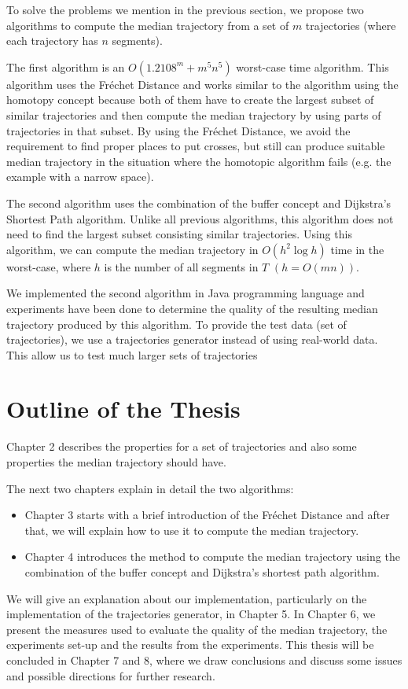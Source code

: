 To solve the problems we mention in the previous section, we propose two algorithms to compute the median trajectory from a set of $m$ trajectories (where each trajectory has $n$ segments).

The first algorithm is an $O(1.2108^{m} + m^{5}n^{5})$ worst-case time algorithm.
This algorithm uses the Fr\'{e}chet Distance \cite{AltGodau:1995} and works similar to the algorithm using the homotopy concept because both of them have to create the largest subset of similar trajectories and then compute the median trajectory by using parts of trajectories in that subset. 
By using the Fr\'{e}chet Distance, we avoid the requirement to find proper places to put crosses, but still can produce suitable median trajectory in the situation where the homotopic algorithm fails (e.g. the example with a narrow space).

The second algorithm uses the combination of the buffer concept and Dijkstra's Shortest Path algorithm.
Unlike all previous algorithms, this algorithm does not need to find the largest subset consisting similar trajectories. 
Using this algorithm, we can compute the median trajectory in $O(h^{2} \log h)$ time in the worst-case, where $h$ is the number of all segments in $T$ $(h = O(mn))$.

We implemented the second algorithm in Java programming language and experiments have been done to determine the quality of the resulting median trajectory produced by this algorithm.
To provide the test data (set of trajectories), we use a trajectories generator instead of using real-world data.
This allow us to test much larger sets of trajectories

\section{Outline of the Thesis}

Chapter 2 describes the properties for a set of trajectories and also some properties the median trajectory should have.

The next two chapters explain in detail the two algorithms:
\begin{itemize}
\item 
Chapter 3 starts with a brief introduction of the Fr\'{e}chet Distance and after that, we will explain how to use it to compute the median trajectory. 
\item 
Chapter 4 introduces the method to compute the median trajectory using the combination of the buffer concept and Dijkstra's shortest path algorithm. 
\end{itemize}

We will give an explanation about our implementation, particularly on the implementation of the trajectories generator, in Chapter 5.
In Chapter 6, we present the measures used to evaluate the quality of the median trajectory, the experiments set-up and the results from the experiments.
This thesis will be concluded in Chapter 7 and 8, where we draw conclusions and discuss some issues and possible directions for further research.

\lipsum[1-14]